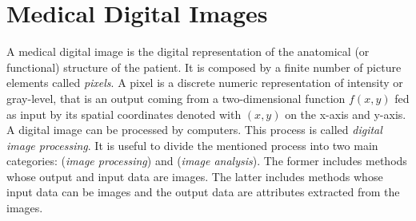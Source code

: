 \documentclass{standalone}
\begin{document}
\section{Medical Digital Images}

A medical digital image is the digital representation of the anatomical (or functional) structure of the patient.
It is composed by a finite number of picture elements called \textit{pixels}.
A pixel is a discrete numeric representation of intensity or gray-level, that is an output coming from a two-dimensional function $f(x, y)$ fed as input by its spatial coordinates denoted with $(x, y)$ on the x-axis and y-axis\cite{Gonzalez}.\\
A digital image can be processed by computers.
This process is called \textit{digital image processing}.
It is useful to divide the mentioned process into two main categories: (\textit{image processing}) and (\textit{image analysis}).
The former includes methods whose output and input data are images.
The latter includes methods whose input data can be images and the output data are attributes extracted from the images.
\end{document}
